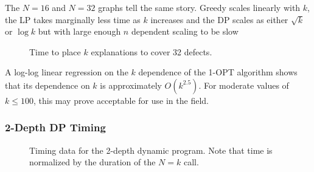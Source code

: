 The $N=16$ and $N=32$ graphs tell the same story. Greedy scales linearly with $k$, the LP takes marginally less time as $k$ increases and the DP scales as either $\sqrt{k}$ or $\log{k}$ but with large enough $n$ dependent scaling to be slow

\begin{figure}[ht!] \centering
  \caption{Time to place $k$ explanations to cover 32 defects.}
\end{figure}

\FloatBarrier

A log-log linear regression on the $k$ dependence of the 1-OPT algorithm shows that its dependence on $k$ is approximately $O(k^{2.5})$.  For moderate values of $k\leq 100$, this may prove acceptable for use in the field. 


\subsubsection{2-Depth DP Timing}

\begin{figure}[ht!] \centering
  \caption{Timing data for the 2-depth dynamic program. Note that time is normalized by the duration of the $N=k$ call.}
\end{figure}

